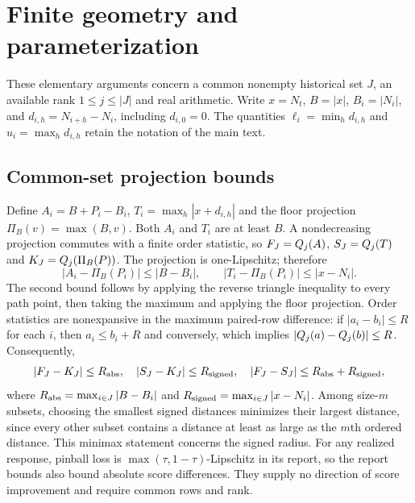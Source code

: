 \section{Finite geometry and parameterization}\label{app:proofs}
These elementary arguments concern a common nonempty historical set $J$, an available rank $1\le j\le |J|$ and real arithmetic. Write $x=N_t$, $B=|x|$, $B_i=|N_i|$, and $d_{i,h}=N_{i+h}-N_i$, including $d_{i,0}=0$. The quantities $\ell_i=\min_h d_{i,h}$ and $u_i=\max_h d_{i,h}$ retain the notation of the main text.

\subsection{Common-set projection bounds}
Define $A_i=B+P_i-B_i$, $T_i=\max_h|x+d_{i,h}|$ and the floor projection $\Pi_B(v)=\max(B,v)$. Both $A_i$ and $T_i$ are at least $B$. A nondecreasing projection commutes with a finite order statistic, so $F_J=Q_j(A)$, $S_J=Q_j(T)$ and $K_J=Q_j(\Pi_B(P))$. The projection is one-Lipschitz; therefore
\begin{equation}
|A_i-\Pi_B(P_i)|\le |B-B_i|,\qquad
|T_i-\Pi_B(P_i)|\le |x-N_i|.
\end{equation}
The second bound follows by applying the reverse triangle inequality to every path point, then taking the maximum and applying the floor projection. Order statistics are nonexpansive in the maximum paired-row difference: if $|a_i-b_i|\le R$ for each $i$, then $a_i\le b_i+R$ and conversely, which implies $|Q_j(a)-Q_j(b)|\le R$. Consequently,
\begin{equation}
|F_J-K_J|\le R_{\rm abs},\quad |S_J-K_J|\le R_{\rm signed},\quad
|F_J-S_J|\le R_{\rm abs}+R_{\rm signed},
\end{equation}
where $R_{\rm abs}=\max_{i\in J}|B-B_i|$ and $R_{\rm signed}=\max_{i\in J}|x-N_i|$. Among size-$m$ subsets, choosing the smallest signed distances minimizes their largest distance, since every other subset contains a distance at least as large as the $m$th ordered distance. This minimax statement concerns the signed radius. For any realized response, pinball loss is $\max(\tau,1-\tau)$-Lipschitz in its report, so the report bounds also bound absolute score differences. They supply no direction of score improvement and require common rows and rank.

